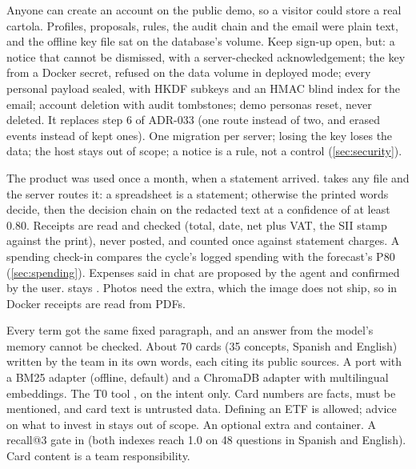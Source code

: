  Anyone can create an account on the public demo, so a visitor could store a real cartola. Profiles,
proposals, rules, the audit chain and the email were plain text, and the offline key file sat on the database's
volume.
 Keep sign-up open, but: a notice that cannot be dismissed, with a server-checked acknowledgement; the
key from a Docker secret, refused on the data volume in deployed mode; every personal payload sealed, with HKDF
subkeys and an HMAC blind index for the email; account deletion with audit tombstones; demo personas reset, never
deleted. It replaces step 6 of ADR-033 (one route instead of two, and erased events instead of kept ones).
 One migration per server; losing the key loses the data; the host stays out of scope; a notice is
a rule, not a control (\cref{sec:security}).

 The product was used once a month, when a statement arrived.
  takes any file and the server routes it: a spreadsheet is a statement;
otherwise the printed words decide, then the decision chain on the redacted text at a confidence of at least 0.80.
Receipts are read and checked (total, date, net plus VAT, the SII stamp against the print), never posted, and counted
once against statement charges. A spending check-in compares the cycle's logged spending with the forecast's P80
(\cref{sec:spending}). Expenses said in chat are proposed by the agent and confirmed by the user.
  stays . Photos need the  extra, which the image
does not ship, so in Docker receipts are read from PDFs.

 Every term got the same fixed paragraph, and an answer from the model's memory cannot be checked.
 About 70 cards (35 concepts, Spanish and English) written by the team in its own words, each citing
its public sources. A  port with a BM25 adapter (offline, default) and a ChromaDB adapter with
multilingual embeddings. The T0 tool , on the  intent only. Card numbers
are facts,  must be mentioned, and card text is untrusted data. Defining an ETF is allowed;
advice on what to invest in stays out of scope.
 An optional  extra and  container. A recall@3 gate in
 (both indexes reach 1.0 on 48 questions in Spanish and English). Card content is a team responsibility.

